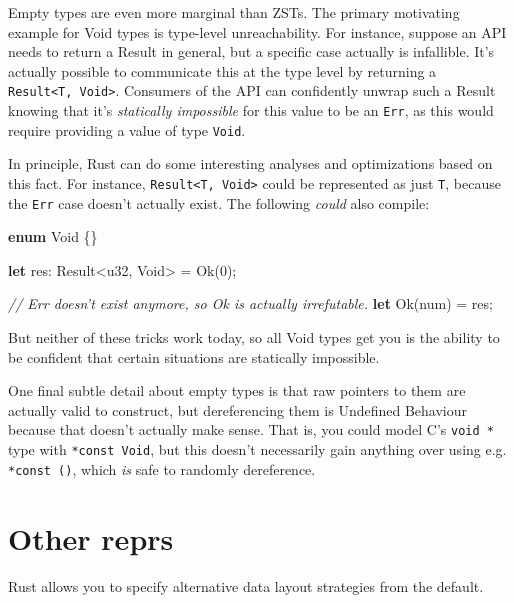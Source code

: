 \documentclass[a4paper,]{book}
\newenvironment{Shaded}{\begin{snugshade}}{\end{snugshade}}
\newcommand{\KeywordTok}[1]{\textcolor[rgb]{0.13,0.29,0.53}{\textbf{{#1}}}}
\newcommand{\DataTypeTok}[1]{\textcolor[rgb]{0.13,0.29,0.53}{{#1}}}
\newcommand{\DecValTok}[1]{\textcolor[rgb]{0.00,0.00,0.81}{{#1}}}
\newcommand{\ConstantTok}[1]{\textcolor[rgb]{0.00,0.00,0.00}{{#1}}}
\newcommand{\CommentTok}[1]{\textcolor[rgb]{0.56,0.35,0.01}{\textit{{#1}}}}
\newcommand{\NormalTok}[1]{{#1}}
\begin{document}
Empty types are even more marginal than ZSTs. The primary motivating
example for Void types is type-level unreachability. For instance,
suppose an API needs to return a Result in general, but a specific case
actually is infallible. It's actually possible to communicate this at
the type level by returning a
\texttt{Result\textless{}T,\ Void\textgreater{}}. Consumers of the API
can confidently unwrap such a Result knowing that it's \emph{statically
impossible} for this value to be an \texttt{Err}, as this would require
providing a value of type \texttt{Void}.

In principle, Rust can do some interesting analyses and optimizations
based on this fact. For instance,
\texttt{Result\textless{}T,\ Void\textgreater{}} could be represented as
just \texttt{T}, because the \texttt{Err} case doesn't actually exist.
The following \emph{could} also compile:

\begin{Shaded}
\begin{Highlighting}[]
\KeywordTok{enum} \NormalTok{Void \{\}}

\KeywordTok{let} \NormalTok{res: }\DataTypeTok{Result}\NormalTok{<}\DataTypeTok{u32}\NormalTok{, Void> = }\ConstantTok{Ok}\NormalTok{(}\DecValTok{0}\NormalTok{);}

\CommentTok{// Err doesn't exist anymore, so Ok is actually irrefutable.}
\KeywordTok{let} \ConstantTok{Ok}\NormalTok{(num) = res;}
\end{Highlighting}
\end{Shaded}

But neither of these tricks work today, so all Void types get you is the
ability to be confident that certain situations are statically
impossible.

One final subtle detail about empty types is that raw pointers to them
are actually valid to construct, but dereferencing them is Undefined
Behaviour because that doesn't actually make sense. That is, you could
model C's \texttt{void\ *} type with \texttt{*const\ Void}, but this
doesn't necessarily gain anything over using e.g. \texttt{*const\ ()},
which \emph{is} safe to randomly dereference.

\section{Other reprs}\label{sec--other-reprs}

Rust allows you to specify alternative data layout strategies from the
default.
\end{document}
